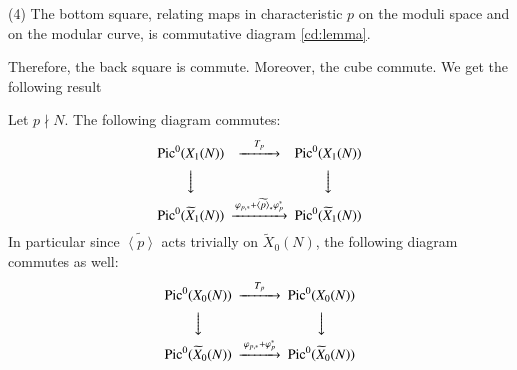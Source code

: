 (4) The bottom square, relating maps in characteristic $p$ on the moduli space and on the modular curve, is commutative diagram \ref{cd:lemma}.\par
Therefore, the back square is commute. Moreover, the cube commute. We get the following result
\begin{theorem}
    Let $p\nmid N$. The following diagram commutes:
    \begin{equation*}
        \begin{CD}
            {\rm Pic}^0(X_1(N)) @>T_p>> {\rm Pic}^0(X_1(N)) \\
            @VVV @VVV \\
            {\rm Pic}^0(\widetilde{X}_1(N))  @>\varphi_{p,*}+\widetilde{\left\langle p \right\rangle }_*\varphi_p^*>> {\rm Pic}^0(\widetilde{X}_1(N))  \\
        \end{CD}
    \end{equation*}
    In particular since $\widetilde{\left\langle p\right\rangle } $ acts trivially on $\widetilde{X}_0(N)$, the following
    diagram commutes as well:
    \begin{equation*}
        \begin{CD}
            {\rm Pic}^0(X_0(N)) @>T_p>> {\rm Pic}^0(X_0(N)) \\
            @VVV @VVV \\
            {\rm Pic}^0(\widetilde{X}_0(N))  @>\varphi_{p,*}+\varphi_p^*>> {\rm Pic}^0(\widetilde{X}_0(N))  \\
        \end{CD}
    \end{equation*}
\end{theorem}


